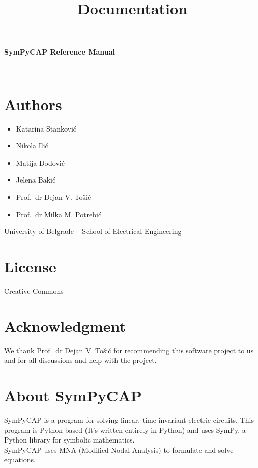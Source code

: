 \documentclass[11pt]{article}
\title{Documentation}
\providecommand{\tightlist}{%
      \setlength{\itemsep}{0pt}\setlength{\parskip}{0pt}}
\begin{document}
    
    
    

    
 \hypertarget{documentation-for-sympycap}{%
\textbf{\Huge SymPyCAP Reference Manual}\label{documentation-for-sympycap}}\\[3ex]

\hypertarget{author}{%
\section{Authors}\label{author}}

\begin{itemize}
\tightlist
\item
  Katarina Stanković
\item
  Nikola Ilić
\item
  Matija Dodović
\item
  Jelena Bakić
\item
  Prof.~dr Dejan V. Tošić
\item
  Prof.~dr Milka M. Potrebić
\end{itemize}

University of Belgrade \textrm{--} School of Electrical Engineering

\hypertarget{license}{%
\section{License}\label{license}}

Creative Commons

\hypertarget{acknowledgment}{%
\section{Acknowledgment}\label{acknowledgment}}

We thank Prof.~dr Dejan V. Tošić for recommending this software project
to us and for all discussions and help with the project.

\hypertarget{about-sympycap}{%
\section{About SymPyCAP}\label{about-sympycap}}

SymPyCAP is a program for solving linear, time-invariant electric
circuits. This program is Python-based (It's written entirely in Python)
and uses SymPy, a Python library for symbolic mathematics.\\
SymPyCAP uses MNA (Modified Nodal Analysis) to formulate and solve
equations.
\end{document}
